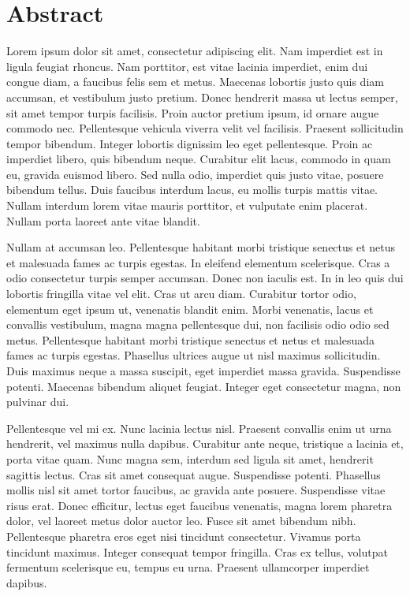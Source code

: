 \newpage
\chapter*{Abstract} \label{abstract}
\pagestyle{empty}
\thispagestyle{empty} 

Lorem ipsum dolor sit amet, consectetur adipiscing elit. Nam imperdiet est in ligula feugiat rhoncus. Nam porttitor, est vitae lacinia imperdiet, enim dui congue diam, a faucibus felis sem et metus. Maecenas lobortis justo quis diam accumsan, et vestibulum justo pretium. Donec hendrerit massa ut lectus semper, sit amet tempor turpis facilisis. Proin auctor pretium ipsum, id ornare augue commodo nec. Pellentesque vehicula viverra velit vel facilisis. Praesent sollicitudin tempor bibendum. Integer lobortis dignissim leo eget pellentesque. Proin ac imperdiet libero, quis bibendum neque. Curabitur elit lacus, commodo in quam eu, gravida euismod libero. Sed nulla odio, imperdiet quis justo vitae, posuere bibendum tellus. Duis faucibus interdum lacus, eu mollis turpis mattis vitae. Nullam interdum lorem vitae mauris porttitor, et vulputate enim placerat. Nullam porta laoreet ante vitae blandit.

Nullam at accumsan leo. Pellentesque habitant morbi tristique senectus et netus et malesuada fames ac turpis egestas. In eleifend elementum scelerisque. Cras a odio consectetur turpis semper accumsan. Donec non iaculis est. In in leo quis dui lobortis fringilla vitae vel elit. Cras ut arcu diam. Curabitur tortor odio, elementum eget ipsum ut, venenatis blandit enim. Morbi venenatis, lacus et convallis vestibulum, magna magna pellentesque dui, non facilisis odio odio sed metus. Pellentesque habitant morbi tristique senectus et netus et malesuada fames ac turpis egestas. Phasellus ultrices augue ut nisl maximus sollicitudin. Duis maximus neque a massa suscipit, eget imperdiet massa gravida. Suspendisse potenti. Maecenas bibendum aliquet feugiat. Integer eget consectetur magna, non pulvinar dui.

Pellentesque vel mi ex. Nunc lacinia lectus nisl. Praesent convallis enim ut urna hendrerit, vel maximus nulla dapibus. Curabitur ante neque, tristique a lacinia et, porta vitae quam. Nunc magna sem, interdum sed ligula sit amet, hendrerit sagittis lectus. Cras sit amet consequat augue. Suspendisse potenti. Phasellus mollis nisl sit amet tortor faucibus, ac gravida ante posuere. Suspendisse vitae risus erat. Donec efficitur, lectus eget faucibus venenatis, magna lorem pharetra dolor, vel laoreet metus dolor auctor leo. Fusce sit amet bibendum nibh. Pellentesque pharetra eros eget nisi tincidunt consectetur. Vivamus porta tincidunt maximus. Integer consequat tempor fringilla. Cras ex tellus, volutpat fermentum scelerisque eu, tempus eu urna. Praesent ullamcorper imperdiet dapibus.